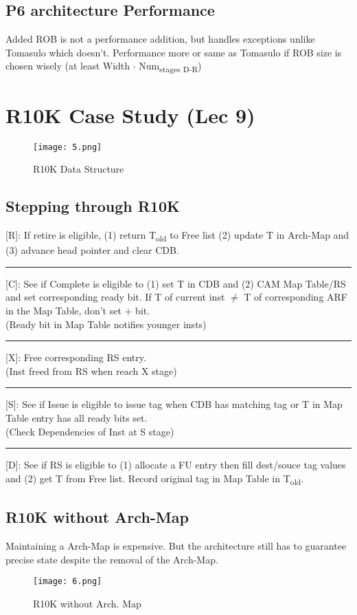 \documentclass{article}
\begin{document}
\begin{multicols*}{2}
\subsection*{P6 architecture Performance}
Added ROB is not a performance addition, but handles exceptions unlike Tomasulo which doesn't. Performance more or same as Tomasulo if ROB size is chosen wisely (at least Width $\cdot$ Num\textsubscript{stages D-R})

\section{R10K Case Study (Lec 9)}

\begin{figure}[H]
  \centering
    {\texttt{[image: 5.png]}}
  \caption{R10K Data Structure}
\end{figure}

\subsection*{Stepping through R10K}
[R]: If retire is eligible, (1) return T\textsubscript{old} to Free list (2) update T in Arch-Map and (3) advance head pointer and clear CDB.
\smallskip\hrule\smallskip\noindent
{[C]}: See if Complete is eligible to (1) set T in CDB and (2) CAM Map Table/RS and set corresponding ready bit. If T of current inst $\neq$ T of corresponding ARF in the Map Table, don't set $+$ bit.\\
(Ready bit in Map Table notifies younger insts)
\smallskip\hrule\smallskip\noindent
{[X]}: Free corresponding RS entry. \\ 
(Inst freed from RS when reach X stage)
\smallskip\hrule\smallskip\noindent
{[S]}: See if Issue is eligible to issue tag when CDB has matching tag or T in Map Table entry has all ready bits set.\\
(Check Dependencies of Inst at S stage)
\smallskip\hrule\smallskip\noindent
{[D]}: See if RS is eligible to (1) allocate a FU entry then fill dest/souce tag values and (2) get T from Free list. Record original tag in Map Table in T\textsubscript{old}.

\subsection*{R10K without Arch-Map}
Maintaining a Arch-Map is expensive. But the architecture still has to guarantee precise state despite the removal of the Arch-Map.
\begin{figure}[H]
  \centering
    {\texttt{[image: 6.png]}}
  \caption{R10K without Arch. Map}
\end{figure}


\end{multicols*}
\end{document}
